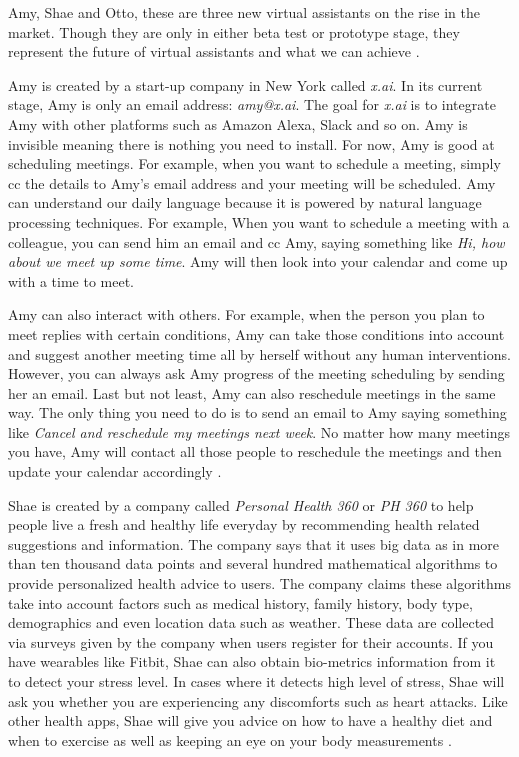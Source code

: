 Amy, Shae and Otto, these are three new virtual assistants on the rise in the market. Though they are only in either beta test or prototype stage, they represent the future of virtual assistants and what we can achieve \cite{Elgan2016future}.

Amy is created by a start-up company in New York called {\em x.ai}. In its current stage, Amy is only an email address: {\em amy@x.ai}. The goal for {\em x.ai} is to integrate Amy with other platforms such as Amazon Alexa, Slack and so on. Amy is invisible meaning there is nothing you need to install. For now, Amy is good at scheduling meetings. For example, when you want to schedule a meeting, simply cc the details to Amy's email address and your meeting will be scheduled. Amy can understand our daily language because it is powered by natural language processing techniques. For example, When you want to schedule a meeting with a colleague, you can send him an email and cc Amy, saying something like {\em Hi, how about we meet up some time}. Amy will then look into your calendar and come up with a time to meet. 

Amy can also interact with others. For example, when the person you plan to meet replies with certain conditions, Amy can take those conditions into account and suggest another meeting time all by herself without any human interventions. However, you can always ask Amy progress of the meeting scheduling by sending her an email. Last but not least, Amy can also reschedule meetings in the same way. The only thing you need to do is to send an email to Amy saying something like {\em Cancel and reschedule my meetings next week}. No matter how many meetings you have, Amy will contact all those people to reschedule the meetings and then update your calendar accordingly \cite{Elgan2016future}.

Shae is created by a company called {\em Personal Health 360} or {\em PH 360} to help people live a fresh and healthy life everyday by recommending health related suggestions and information. The company says that it uses big data as in more than ten thousand data points and several hundred mathematical algorithms to provide personalized health advice to users. The company claims these algorithms take into account factors such as medical history, family history, body type, demographics and even location data such as weather. These data are collected via surveys given by the company when users register for their accounts. If you have wearables like Fitbit, Shae can also obtain bio-metrics information from it to detect your stress level. In cases where it detects high level of stress, Shae will ask you whether you are experiencing any discomforts such as heart attacks. Like other health apps, Shae will give you advice on how to have a healthy diet and when to exercise as well as keeping an eye on your body measurements \cite{Elgan2016future}.

